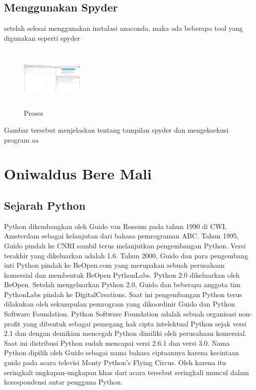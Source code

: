 \subsection{Menggunakan Spyder}
setelah selesai menggunakan instalasi anaconda,  maka ada beberapa tool yang digunakan seperti spyder
\begin{figure}[!htbp]
        \centering
        \includegraphics[width=3cm,height=3cm]{figures/felix/10.png}
        \caption{Proses}
        \label{awal}
        \end{figure}

Gambar tersebut menjelaskan tentang tampilan spyder dan mengeksekusi program aa



\section{Oniwaldus Bere Mali}
\subsection{Sejarah Python}
              Python dikembangkan oleh Guido van Rossum pada tahun 1990 di CWI, Amsterdam sebagai kelanjutan dari bahasa pemrograman ABC. Tahun 1995, Guido pindah ke CNRI sambil terus melanjutkan pengembangan Python. Versi terakhir yang dikeluarkan adalah 1.6. Tahun 2000, Guido dan para pengembang inti Python pindah ke BeOpen.com yang merupakan sebuah perusahaan komersial dan membentuk BeOpen PythonLabs. Python 2.0 dikeluarkan oleh BeOpen. Setelah mengeluarkan Python 2.0, Guido dan beberapa anggota tim PythonLabs pindah ke DigitalCreations. Saat ini pengembangan Python terus dilakukan oleh sekumpulan pemrogram yang dikoordinir Guido dan Python Software Foundation. Python Software Foundation adalah sebuah organisasi non-profit yang dibentuk sebagai pemegang hak cipta intelektual Python sejak versi 2.1 dan dengan demikian mencegah Python dimiliki oleh perusahaan komersial. Saat ini distribusi Python sudah mencapai versi 2.6.1 dan versi 3.0. Nama Python dipilih oleh Guido sebagai nama bahasa ciptaannya karena kecintaan guido pada acara televisi Monty Python's Flying Circus. Oleh karena itu seringkali ungkapan-ungkapan khas dari acara tersebut seringkali muncul dalam korespondensi antar pengguna Python.

